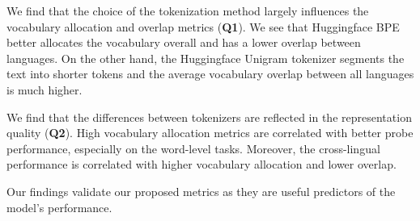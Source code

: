 We find that the choice of the tokenization method largely influences the vocabulary allocation and overlap metrics (\textbf{Q1}). We see that Huggingface BPE better allocates the vocabulary overall and has a lower overlap between languages. On the other hand, the Huggingface Unigram tokenizer segments the text into shorter tokens and the average vocabulary overlap between all languages is much higher.

We find that the differences between tokenizers are reflected in the representation quality (\textbf{Q2}). High vocabulary allocation metrics are correlated with better probe performance, especially on the word-level tasks. Moreover, the cross-lingual performance is correlated with higher vocabulary allocation and lower overlap.

Our findings validate our proposed metrics as they are useful predictors of the model's performance.